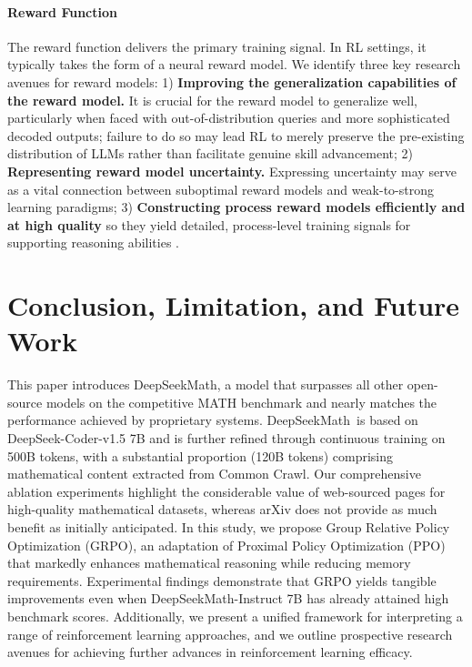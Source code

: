 \begin{itemize}[topsep=0pt]
\begin{itemize}[topsep=0pt]
\paragraph{Reward Function} The reward function delivers the primary training signal. In RL settings, it typically takes the form of a neural reward model. We identify three key research avenues for reward models: 1) \textbf{Improving the generalization capabilities of the reward model.} It is crucial for the reward model to generalize well, particularly when faced with out-of-distribution queries and more sophisticated decoded outputs; failure to do so may lead RL to merely preserve the pre-existing distribution of LLMs rather than facilitate genuine skill advancement; 2) \textbf{Representing reward model uncertainty.} Expressing uncertainty may serve as a vital connection between suboptimal reward models and weak-to-strong learning paradigms; 3) \textbf{Constructing process reward models efficiently and at high quality} so they yield detailed, process-level training signals for supporting reasoning abilities \citep{lightman2023let,wang2023math}.

\section{Conclusion, Limitation, and Future Work}  
This paper introduces DeepSeekMath, a model that surpasses all other open-source models on the competitive MATH benchmark and nearly matches the performance achieved by proprietary systems. DeepSeekMath~is based on DeepSeek-Coder-v1.5 7B and is further refined through continuous training on 500B tokens, with a substantial proportion (120B tokens) comprising mathematical content extracted from Common Crawl. Our comprehensive ablation experiments highlight the considerable value of web-sourced pages for high-quality mathematical datasets, whereas arXiv does not provide as much benefit as initially anticipated. In this study, we propose Group Relative Policy Optimization (GRPO), an adaptation of Proximal Policy Optimization (PPO) that markedly enhances mathematical reasoning while reducing memory requirements. Experimental findings demonstrate that GRPO yields tangible improvements even when DeepSeekMath-Instruct 7B has already attained high benchmark scores. Additionally, we present a unified framework for interpreting a range of reinforcement learning approaches, and we outline prospective research avenues for achieving further advances in reinforcement learning efficacy.


\end{itemize}
\end{itemize}
